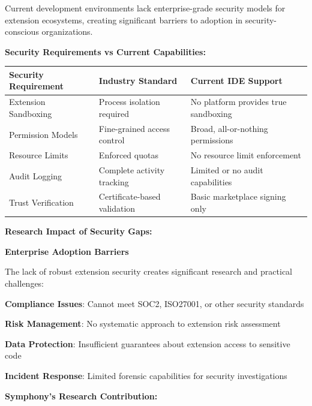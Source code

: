 Current development environments lack enterprise-grade security models for extension ecosystems, creating significant barriers to adoption in security-conscious organizations.

\textbf{Security Requirements vs Current Capabilities:}

\begin{center}
\begin{tabular}{@{}p{4cm}p{3cm}p{5cm}@{}}
\toprule
\textbf{Security Requirement} & \textbf{Industry Standard} & \textbf{Current IDE Support} \\
\midrule
Extension Sandboxing & Process isolation required & No platform provides true sandboxing \\
Permission Models & Fine-grained access control & Broad, all-or-nothing permissions \\
Resource Limits & Enforced quotas & No resource limit enforcement \\
Audit Logging & Complete activity tracking & Limited or no audit capabilities \\
Trust Verification & Certificate-based validation & Basic marketplace signing only \\
\bottomrule
\end{tabular}
\label{tab:security-gaps}
\end{center}

\textbf{Research Impact of Security Gaps:}

\begin{alertbox}
\textbf{Enterprise Adoption Barriers}

The lack of robust extension security creates significant research and practical challenges:
\begin{compactlist}
    \item \textbf{Compliance Issues}: Cannot meet SOC2, ISO27001, or other security standards
    \item \textbf{Risk Management}: No systematic approach to extension risk assessment
    \item \textbf{Data Protection}: Insufficient guarantees about extension access to sensitive code
    \item \textbf{Incident Response}: Limited forensic capabilities for security investigations
\end{compactlist}
\end{alertbox}

\textbf{Symphony's Research Contribution:}

